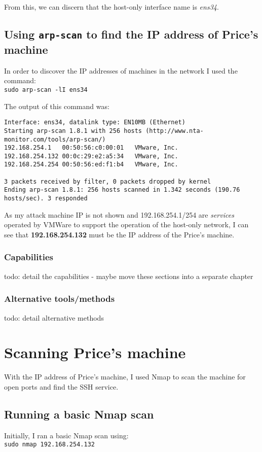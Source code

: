 \documentclass[12pt]{report}
\newcommand{\term}[1]{\colorbox{light-gray}{\texttt{#1}}}
\begin{document}
From this, we can discern that the host-only interface name is \textit{ens34}.

\subsection{Using \texttt{arp-scan} to find the IP address of Price's machine}
In order to discover the IP addresses of machines in the network I used the command:\\
\term{sudo arp-scan -lI ens34}

The output of this command was:
\begin{Verbatim}[fontsize=\small]
Interface: ens34, datalink type: EN10MB (Ethernet)
Starting arp-scan 1.8.1 with 256 hosts (http://www.nta-monitor.com/tools/arp-scan/)
192.168.254.1	00:50:56:c0:00:01	VMware, Inc.
192.168.254.132	00:0c:29:e2:a5:34	VMware, Inc.
192.168.254.254	00:50:56:ed:f1:b4	VMware, Inc.

3 packets received by filter, 0 packets dropped by kernel
Ending arp-scan 1.8.1: 256 hosts scanned in 1.342 seconds (190.76 hosts/sec). 3 responded
\end{Verbatim}

As my attack machine IP is not shown and 192.168.254.1/254 are \textit{services} operated by VMWare to support the operation of the host-only network, I can see that \textbf{192.168.254.132} must be the IP address of the Price's machine.

\subsubsection{Capabilities}
todo: detail the capabilities - maybe move these sections into a separate chapter
\subsubsection{Alternative tools/methods}
todo: detail alternative methods


\section{Scanning Price's machine}
With the IP address of Price's machine, I used Nmap to scan the machine for open ports and find the SSH service.
\subsection{Running a basic Nmap scan}
Initially, I ran a basic Nmap scan using:\\
\term{sudo nmap 192.168.254.132}
\end{document}
